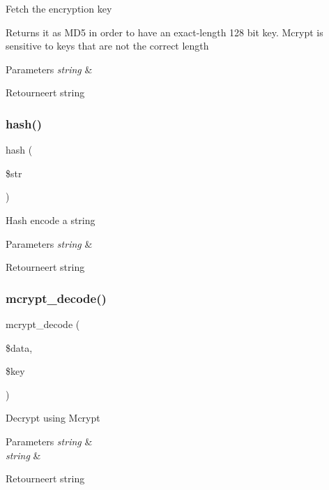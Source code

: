 Fetch the encryption key

Returns it as M\+D5 in order to have an exact-\/length 128 bit key. Mcrypt is sensitive to keys that are not the correct length


\begin{DoxyParams}{Parameters}
{\em string} & \\
\hline
\end{DoxyParams}
\begin{DoxyReturn}{Retourneert}
string 
\end{DoxyReturn}
\mbox{\label{class_c_i___encrypt_aea8db0058c00fd2bc1351ddb2ebf3191}} 
\subsubsection{\texorpdfstring{hash()}{hash()}}
{\footnotesize\ttfamily hash (\begin{DoxyParamCaption}\item[{}]{\$str }\end{DoxyParamCaption})}

Hash encode a string


\begin{DoxyParams}{Parameters}
{\em string} & \\
\hline
\end{DoxyParams}
\begin{DoxyReturn}{Retourneert}
string 
\end{DoxyReturn}
\mbox{\label{class_c_i___encrypt_a85f02c928abbbc5a6bf038ea5292324d}} 
\subsubsection{\texorpdfstring{mcrypt\_decode()}{mcrypt\_decode()}}
{\footnotesize\ttfamily mcrypt\+\_\+decode (\begin{DoxyParamCaption}\item[{}]{\$data,  }\item[{}]{\$key }\end{DoxyParamCaption})}

Decrypt using Mcrypt


\begin{DoxyParams}{Parameters}
{\em string} & \\
\hline
{\em string} & \\
\hline
\end{DoxyParams}
\begin{DoxyReturn}{Retourneert}
string 
\end{DoxyReturn}
\mbox{\label{class_c_i___encrypt_aa1d7e40f65deb526fe4619da65c6b1ec}} 
